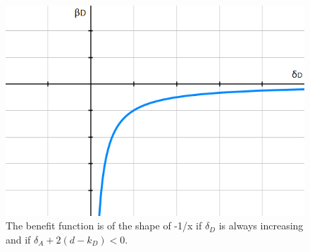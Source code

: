 \begin{figure}
\centering
\includegraphics[scale=0.5]{Images/ShapeDown.png} 
\caption{The benefit function is of the shape of -1/x if $\delta_{D}$ is always increasing and if $\delta_{A} + 2(d-k_{D}) < 0$.}
\label{ShapeDown}
\end{figure}
%
~~\\

